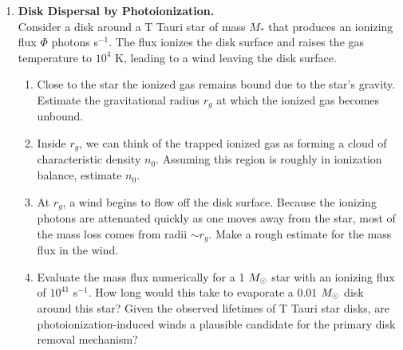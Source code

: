 \begin{enumerate}
\item {\bf Disk Dispersal by Photoionization.}\\
Consider a disk around a T Tauri star of mass $M_*$ that produces an ionizing flux $\Phi$ photons s$^{-1}$. The flux ionizes the disk surface and raises the gas temperature to $10^4$ K, leading to a wind leaving the disk surface.
\begin{enumerate}
\item Close to the star the ionized gas remains bound due to the star's gravity. Estimate the gravitational radius $r_g$ at which the ionized gas becomes unbound.
\item Inside $r_g$, we can think of the trapped ionized gas as forming a cloud of characteristic density $n_0$. Assuming this region is roughly in ionization balance, estimate $n_0$.
\item At $r_g$, a wind begins to flow off the disk surface. Because the ionizing photons are attenuated quickly as one moves away from the star, most of the mass loss comes from radii $\sim r_g$. Make a rough estimate for the mass flux in the wind.
\item Evaluate the mass flux numerically for a 1 $M_{\odot}$ star with an ionizing flux of $10^{41}$ s$^{-1}$. How long would this take to evaporate a $0.01$ $M_{\odot}$ disk around this star? Given the observed lifetimes of T Tauri star disks, are photoionization-induced winds a plausible candidate for the primary disk removal mechanism?
\end{enumerate}


\end{enumerate}
